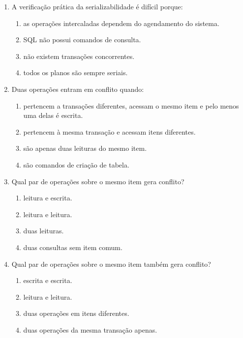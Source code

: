 \documentclass[12pt,a4paper]{article}
\begin{document}
\begin{enumerate}[label=\textbf{Q\arabic*.}]
\item A verificação prática da serializabilidade é difícil porque:

\begin{enumerate}[label=\alph*)]
    \item as operações intercaladas dependem do agendamento do sistema.
    \item SQL não possui comandos de consulta.
    \item não existem transações concorrentes.
    \item todos os planos são sempre seriais.
\end{enumerate}

\item Duas operações entram em conflito quando:

\begin{enumerate}[label=\alph*)]
    \item pertencem a transações diferentes, acessam o mesmo item e pelo menos uma delas é escrita.
    \item pertencem à mesma transação e acessam itens diferentes.
    \item são apenas duas leituras do mesmo item.
    \item são comandos de criação de tabela.
\end{enumerate}

\item Qual par de operações sobre o mesmo item gera conflito?

\begin{enumerate}[label=\alph*)]
    \item leitura e escrita.
    \item leitura e leitura.
    \item duas leituras.
    \item duas consultas sem item comum.
\end{enumerate}

\item Qual par de operações sobre o mesmo item também gera conflito?

\begin{enumerate}[label=\alph*)]
    \item escrita e escrita.
    \item leitura e leitura.
    \item duas operações em itens diferentes.
    \item duas operações da mesma transação apenas.
\end{enumerate}


\end{enumerate}
\end{document}
